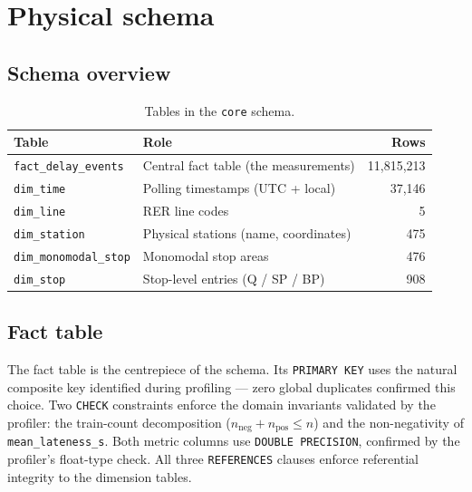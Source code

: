 \documentclass[a4paper,11pt]{article}
\begin{document}
\section{Physical schema}
\label{sec:schema}

\subsection{Schema overview}

\begin{table}[H]
\centering
\begin{tabular}{llr}
\toprule
\textbf{Table} & \textbf{Role} & \textbf{Rows} \\
\midrule
\texttt{fact\_delay\_events} & Central fact table (the measurements) & 11,815,213 \\
\texttt{dim\_time}           & Polling timestamps (UTC + local)      & 37,146 \\
\texttt{dim\_line}           & RER line codes                        & 5 \\
\texttt{dim\_station}        & Physical stations (name, coordinates) & 475 \\
\texttt{dim\_monomodal\_stop}& Monomodal stop areas                  & 476 \\
\texttt{dim\_stop}           & Stop-level entries (Q / SP / BP)      & 908 \\
\bottomrule
\end{tabular}
\caption{Tables in the \texttt{core} schema.}
\label{tab:tables}
\end{table}

\subsection{Fact table}

The fact table is the centrepiece of the schema.
Its \texttt{PRIMARY KEY} uses the natural composite key identified during profiling
--- zero global duplicates confirmed this choice.
Two \texttt{CHECK} constraints enforce the domain invariants validated by the
profiler: the train-count decomposition ($n_{\text{neg}} + n_{\text{pos}} \leq n$)
and the non-negativity of \texttt{mean\_lateness\_s}.
Both metric columns use \texttt{DOUBLE PRECISION}, confirmed by the profiler's
float-type check.
All three \texttt{REFERENCES} clauses enforce referential integrity to the
dimension tables.
\end{document}
